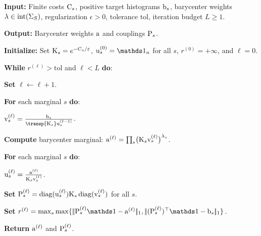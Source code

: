 \begin{alg}\label{alg:entropic-barycenter-sinkhorn}
\textbf{Input:} Finite costs $\C_s$, positive target histograms $\b_s$, barycenter weights $\lambda\in\operatorname{int}(\simplex_S)$, regularization $\epsilon>0$, tolerance $\mathrm{tol}$, iteration budget $L\geq1$.

\textbf{Output:} Barycenter weights $\a$ and couplings $\P_s$.

\textbf{Initialize:} Set $\K_s=e^{-\C_s/\epsilon}$, $\uD_s^{(0)}=\ones_n$ for all $s$, \(r^{(0)}=+\infty\), and \(\ell=0\).

\textbf{While} \(r^{(\ell)}>\mathrm{tol}\) and $\ell<L$ \textbf{do}:
\begin{algblock}

\textbf{Set} \(\ell\leftarrow \ell+1\).

\textbf{For} each marginal $s$ \textbf{do}:
\begin{algblock}
\(\vD_s^{(\ell)} = \frac{\b_s}{\transp{\K_s}\uD_s^{(\ell-1)}}\).
\end{algblock}
\textbf{Compute} barycenter marginal:
\(\a^{(\ell)} = \prod_s \bigl(\K_s\vD_s^{(\ell)}\bigr)^{\lambda_s}\).

\textbf{For} each marginal $s$ \textbf{do}:
\begin{algblock}
\(\uD_s^{(\ell)} = \frac{\a^{(\ell)}}{\K_s\vD_s^{(\ell)}}\).
\end{algblock}

\textbf{Set} \(\P_s^{(\ell)}=\diag(\uD_s^{(\ell)})\K_s\diag(\vD_s^{(\ell)})\) for all \(s\).

\textbf{Set} \(r^{(\ell)}=\max_s \max\{\norm{\P_s^{(\ell)}\ones-\a^{(\ell)}}_1,\norm{(\P_s^{(\ell)})^\top\ones-\b_s}_1\}\).
\end{algblock}
\algreturnskip
\textbf{Return} \(\a^{(\ell)}\) and \(\P_s^{(\ell)}\).
\end{alg}

